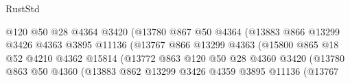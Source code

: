 \begin{lexlean}{RustStd}
\begin{coremodule}
                                            @120
                                            @50
                                            @28
                                            @4364
                                            @3420
                                            (@13780
                                              @867
                                              @50
                                              @4364
                                              (@13883
                                                @866
                                                @13299
                                                @3426
                                                @4363
                                                @3895
                                                @11136
                                                (@13767
                                                  @866
                                                  @13299
                                                  @4363
                                                  (@15800
                                                    @865
                                                    @18
                                                    @52
                                                    @4210
                                                    @4362
                                                    @15814
                                                    (@13772
                                                      @863
                                                      @120
                                                      @50
                                                      @28
                                                      @4360
                                                      @3420
                                                      (@13780
                                                        @863
                                                        @50
                                                        @4360
                                                        (@13883
                                                          @862
                                                          @13299
                                                          @3426
                                                          @4359
                                                          @3895
                                                          @11136
                                                          (@13767

\end{coremodule}
\end{lexlean}
